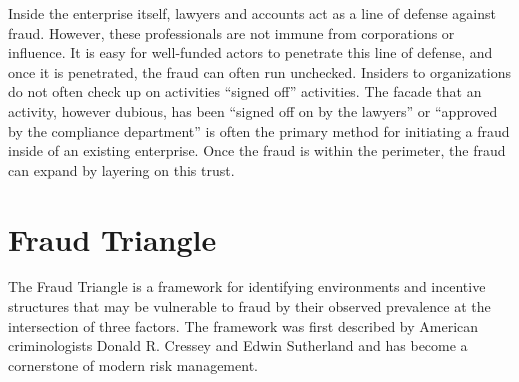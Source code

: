 Inside the enterprise itself, lawyers and accounts act as a line of defense
against fraud. However, these professionals are not immune from corporations or
influence. It is easy for well-funded actors to penetrate this line of defense,
and once it is penetrated, the fraud can often run unchecked. Insiders to
organizations do not often check up on activities ``signed off'' activities. The
facade that an activity, however dubious, has been ``signed off on by the
lawyers'' or ``approved by the compliance department'' is often the primary
method for initiating a fraud inside of an existing enterprise. Once the fraud
is within the perimeter, the fraud can expand by layering on this trust.

\section{Fraud Triangle}

The Fraud Triangle is a framework for identifying environments and incentive
structures that may be vulnerable to fraud by their observed prevalence at the
intersection of three factors. The framework was first described by American
criminologists Donald R. Cressey and Edwin Sutherland and has become a
cornerstone of modern risk management.

